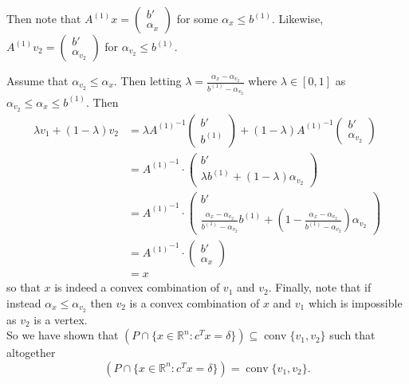 \documentclass[11pt]{article}
\DeclareMathOperator{\conv}{conv}
\newcommand{\setR}{\mathbb{R}}
\renewcommand{\leq}{\leqslant}
\begin{document}
\begin{enumerate}[1)]
\begin{solution}
Then note that $ A^{(1)} x =  \begin{pmatrix} b' \\ \alpha_x\end{pmatrix}$ for some $\alpha_x \leq b^{(1)}$. Likewise,  $ A^{(1)} v_2=  \begin{pmatrix} b' \\ \alpha_{v_2}\end{pmatrix}$ for $\alpha_{v_2} \leq b^{(1)}$. 

Assume that $\alpha_{v_2} \leq \alpha_x$. Then letting $\lambda = \frac{\alpha_x - \alpha_{v_2}}{b^{(1)}- \alpha_{v_2}}$ where $\lambda \in [0,1]$ as $\alpha_{v_2} \leq \alpha_x \leq b^{(1)}$. Then 
\begin{align*}
\lambda v_1 + (1- \lambda)v_2 & = \lambda {A^{(1)}}^{-1}\begin{pmatrix} b' \\ b^{(1)} \end{pmatrix} + (1 - \lambda) {A^{(1)}}^{-1}\begin{pmatrix} b' \\ \alpha_{v_2} \end{pmatrix} \\
& = {A^{(1)}}^{-1} \cdot \begin{pmatrix} b' \\ \lambda b^{(1)}  + (1-\lambda) \alpha_{v_2}\end{pmatrix} \\
& = {A^{(1)}}^{-1} \cdot \begin{pmatrix} b' \\ \frac{\alpha_x - \alpha_{v_2}}{b^{(1)}- \alpha_{v_2}} b^{(1)}  + \left(1-\frac{\alpha_x - \alpha_{v_2}}{b^{(1)}- \alpha_{v_2}}\right) \alpha_{v_2}\end{pmatrix} \\
& = {A^{(1)}}^{-1} \cdot \begin{pmatrix} b' \\ \alpha_x \end{pmatrix} \\
& = x
\end{align*}
so that $x$ is indeed a convex combination of $v_1$ and $v_2$. Finally, note that if instead $\alpha_{x} \leq \alpha_{v_2}$ then $v_2$ is a convex combination of $x$ and $v_1$ which is impossible as $v_2$ is a vertex. 
\\


So we have shown that $(P \cap \{x \in \setR^n: c^Tx = \delta\}) \subseteq \conv\{v_1, v_2\}$ such that altogether $$(P \cap \{x \in \setR^n: c^Tx = \delta\}) = \conv\{v_1, v_2\}.$$






\end{solution}
\end{enumerate}
\end{document}
